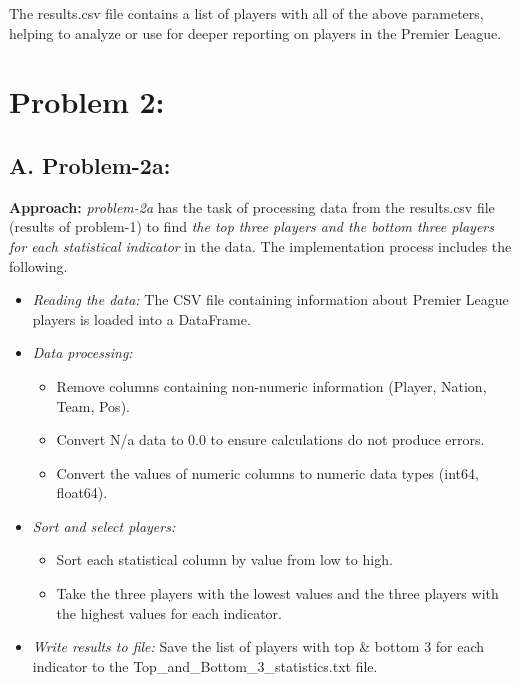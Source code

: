 \documentclass[12pt]{article}
\begin{document}
The results.csv file contains a list of players with all of the above parameters, helping to analyze or use for deeper reporting on players in the Premier League.

\section{Problem 2:}

\subsection*{A. Problem-2a:}

\textbf{Approach:} \textit{problem-2a} has the task of processing data from the results.csv file (results of problem-1) to find \textit{the top three players and the bottom three players for each statistical indicator} in the data. The implementation process includes the following.

\begin{itemize}
    \item \textit{Reading the data:} The CSV file containing information about Premier League players is loaded into a DataFrame.
    \item \textit{Data processing:}
    
    \begin{itemize}
        \item Remove columns containing non-numeric information (Player, Nation, Team, Pos).
        \item Convert N/a data to 0.0 to ensure calculations do not produce errors.
        \item Convert the values of numeric columns to numeric data types (int64, float64).
    \end{itemize}
    
    \item \textit{Sort and select players:}
    
    \begin{itemize}
        \item Sort each statistical column by value from low to high.
        \item Take the three players with the lowest values and the three players with the highest values for each indicator.
    \end{itemize}
    
    \item \textit{Write results to file:} Save the list of players with top \& bottom 3 for each indicator to the Top\_and\_Bottom\_3\_statistics.txt file.
\end{itemize}
\end{document}
